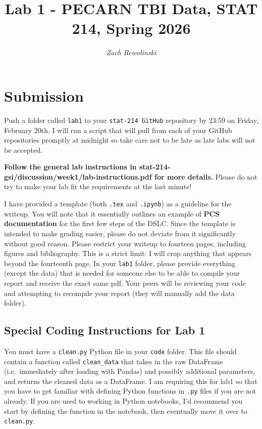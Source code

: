 \documentclass[10pt,letterpaper]{article}
\title{Lab 1 - PECARN TBI Data, STAT 214, Spring 2026}
\author{\textit{Zach Rewolinski}}
\begin{document}
\maketitle

\section*{Submission}
Push a folder called \texttt{lab1} to your \texttt{stat-214 GitHub} repository by 23:59 on Friday, February 20th. I will run a script that will pull from each of your GitHub repositories promptly at midnight so take care not to be late as late labs will not be accepted.

\textbf{Follow the general lab instructions in stat-214-gsi/discussion/week1/lab-instructions.pdf for more details.} Please do not try to make your lab fit the requirements at the last minute!

I have provided a template (both \texttt{.tex} and \texttt{.ipynb}) as a guideline for the writeup. You will note that it essentially outlines an example of \textbf{PCS documentation} for the first few steps of the DSLC. Since the template is intended to make grading easier, please do not deviate from it significantly without good reason. Please restrict your writeup to fourteen pages, including figures and bibliography. This is a strict limit: I will crop anything that appears beyond the fourteenth page. In your \texttt{lab1} folder, please provide everything (except the data) that is needed for someone else to be able to compile your report and receive the exact same pdf. Your peers will be reviewing your code and attempting to recompile your report (they will manually add the data folder).

\subsection*{Special Coding Instructions for Lab 1}

You must have a \texttt{clean.py} Python file in your \texttt{code} folder. This file should contain a function called \texttt{clean\_data} that takes in the raw DataFrame (i.e.~immediately after loading with Pandas) and possibly additional parameters, and returns the cleaned data as a DataFrame. I am requiring this for lab1 so that you have to get familiar with defining Python functions in \texttt{.py} files if you are not already. If you are used to working in Python notebooks, I'd recommend you start by defining the function in the notebook, then eventually move it over to \texttt{clean.py}.
\end{document}
